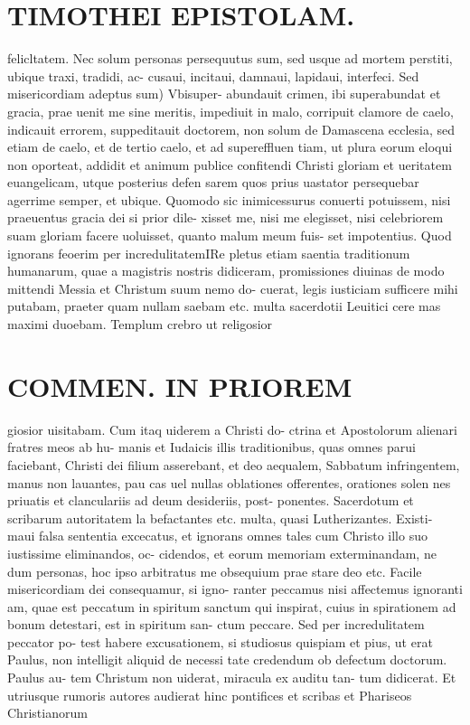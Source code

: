 \documentclass{article}
\begin{document}
\begin{pages}
\section*{TIMOTHEI EPISTOLAM. }
\marginpar{[ p.27 ]}\pstart felicltatem. Nec solum personas persequutus sum, sed usque ad mortem perstiti, ubique traxi, tradidi, ac- cusaui, incitaui, damnaui, lapidaui, interfeci.  \pend\pstart Sed misericordiam adeptus sum) Vbisuper- abundauit crimen, ibi superabundat et gracia, prae uenit me sine meritis, impediuit in malo, corripuit clamore de caelo, indicauit errorem, suppeditauit doctorem, non solum de Damascena ecclesia, sed etiam de caelo, et de tertio caelo, et ad supereffluen tiam, ut plura eorum eloqui non oporteat, addidit et animum publice confitendi Christi gloriam et ueritatem euangelicam, utque posterius defen sarem quos prius uastator persequebar agerrime semper, et ubique. Quomodo sic inimicessurus conuerti potuissem, nisi praeuentus gracia dei si prior dile- xisset me, nisi me elegisset, nisi celebriorem suam gloriam facere uoluisset, quanto malum meum fuis- set impotentius.  \pend\pstart Quod ignorans feoerim per incredulitatemIRe pletus etiam saentia traditionum humanarum, quae a magistris nostris didiceram, promissiones diuinas de modo mittendi Messia et Christum suum nemo do- cuerat, legis iusticiam sufficere mihi putabam, praeter quam nullam saebam etc. multa sacerdotii Leuitici cere mas maximi duoebam. Templum crebro ut religosior  \pend
\section*{COMMEN. IN PRIOREM }
\marginpar{[ p.28 ]}\pstart giosior uisitabam. Cum itaq uiderem a Christi do- ctrina et Apostolorum alienari fratres meos ab hu- manis et Iudaicis illis traditionibus, quas omnes parui faciebant, Christi dei filium asserebant, et deo aequalem, Sabbatum infringentem, manus non lauantes, pau cas uel nullas oblationes offerentes, orationes solen nes priuatis et clanculariis ad deum desideriis, post- ponentes. Sacerdotum et scribarum autoritatem la befactantes etc. multa, quasi Lutherizantes. Existi- maui falsa sententia excecatus, et ignorans omnes tales cum Christo illo suo iustissime eliminandos, oc- cidendos, et eorum memoriam exterminandam, ne dum personas, hoc ipso arbitratus me obsequium prae stare deo etc.  \pend\pstart Facile misericordiam dei consequamur, si igno- ranter peccamus nisi affectemus ignoranti am, quae est peccatum in spiritum sanctum qui inspirat, cuius in spirationem ad bonum detestari, est in spiritum san- ctum peccare. Sed per incredulitatem peccator po- test habere excusationem, si studiosus quispiam et pius, ut erat Paulus, non intelligit aliquid de necessi tate credendum ob defectum doctorum. Paulus au- tem Christum non uiderat, miracula ex auditu tan- tum didicerat. Et utriusque rumoris autores audierat hinc pontifices et scribas et Phariseos Christianorum  \pend

\end{pages}
\end{document}
